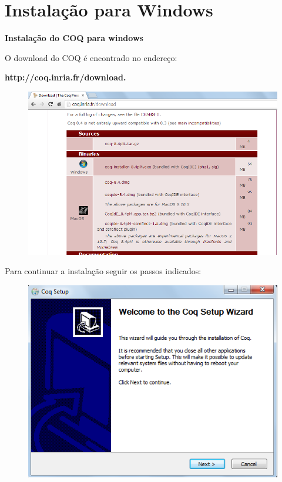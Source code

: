 \section{Instala\c{c}\~ao para Windows}
\begin{center}
{\textbf {Instala\c{c}\~{a}o do COQ para windows }}\\
\end{center}
\begin{flushleft}
O download do COQ \'{e} encontrado no endere\c{c}o: \begin{center}\textbf{http://coq.inria.fr/download.}\\
\end{center}
\begin{figure}[!htb]
\centering
\includegraphics[scale=0.4]{imagens/1.png}
\end{figure}
Para continuar a instala\c{c}\~{a}o seguir os passos indicados:\\
\begin{figure}[!htb]
\includegraphics[scale=0.4]{imagens/2.png}

\end{figure}
\end{flushleft}
